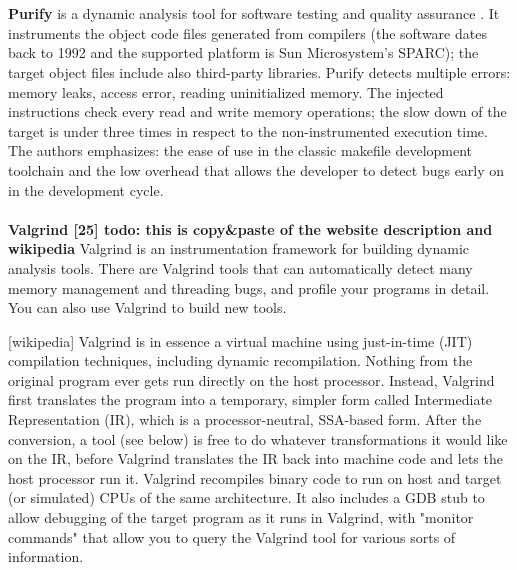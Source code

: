 \\
\\

\textbf{Purify}
 is a dynamic  analysis tool for software testing and quality assurance \cite{hastings1992fast}. 
 It instruments the object code files generated from compilers (the software dates back to 1992 and the supported platform is Sun Microsystem's SPARC); the target object files include also third-party libraries. Purify detects multiple errors: memory leaks, access error, reading uninitialized memory. The injected instructions check every read and write memory operations; the slow down of the target is under three times in respect to the non-instrumented execution time. The authors emphasizes: the ease of use in the classic makefile development toolchain and the low overhead that allows the developer to detect bugs early on in the development cycle.
\\
\\
\textbf{Valgrind [25] todo: this is copy\&paste of the website description and wikipedia}
Valgrind is an instrumentation framework for building dynamic analysis tools. There are Valgrind tools that can automatically detect many memory management and threading bugs, and profile your programs in detail. You can also use Valgrind to build new tools.

[wikipedia]
Valgrind is in essence a virtual machine using just-in-time (JIT) compilation techniques, including dynamic recompilation. Nothing from the original program ever gets run directly on the host processor. Instead, Valgrind first translates the program into a temporary, simpler form called Intermediate Representation (IR), which is a processor-neutral, SSA-based form. After the conversion, a tool (see below) is free to do whatever transformations it would like on the IR, before Valgrind translates the IR back into machine code and lets the host processor run it. Valgrind recompiles binary code to run on host and target (or simulated) CPUs of the same architecture. It also includes a GDB stub to allow debugging of the target program as it runs in Valgrind, with "monitor commands" that allow you to query the Valgrind tool for various sorts of information.

